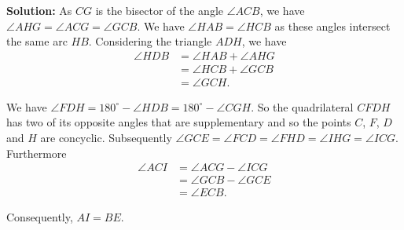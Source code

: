 \documentclass{article}
\newcommand{\solution}[1]{%
\ifsolutions%
    \textbf{Solution: } #1
\fi
}
\begin{document}
\begin{enumerate}
\solution{%
As $CG$ is the bisector of the angle $\angle ACB$, we have $\angle AHG = \angle ACG = \angle GCB$. We have $\angle HAB = \angle HCB$ as these angles intersect the same arc $HB$. Considering the triangle $ADH$, we have
\begin{align*}
    \angle HDB & = \angle HAB + \angle AHG \\
        & = \angle HCB + \angle GCB \\
        & = \angle GCH.
\end{align*}

We have $\angle FDH = 180^\circ - \angle HDB = 180^\circ - \angle CGH$. So the quadrilateral $CFDH$ has two of its opposite angles that are supplementary and so the points $C$, $F$, $D$ and $H$ are concyclic. Subsequently $\angle GCE = \angle FCD = \angle FHD = \angle IHG = \angle ICG$. Furthermore
\begin{align*}
    \angle ACI & = \angle ACG - \angle ICG \\
        & = \angle GCB - \angle GCE \\
        & = \angle ECB.
\end{align*}

Consequently, $AI = BE$.
}

\end{enumerate}
\end{document}
